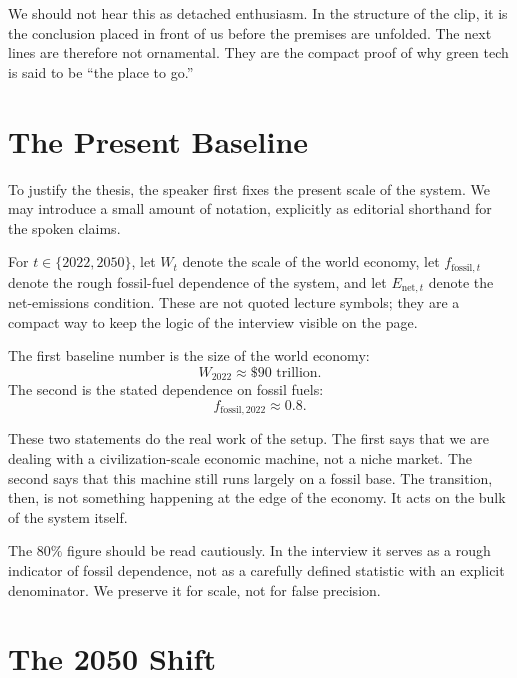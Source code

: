 We should not hear this as detached enthusiasm. In the structure of the clip, it is the conclusion placed in front of us before the premises are unfolded. The next lines are therefore not ornamental. They are the compact proof of why green tech is said to be ``the place to go.''

\section{The Present Baseline}

To justify the thesis, the speaker first fixes the present scale of the system. We may introduce a small amount of notation, explicitly as editorial shorthand for the spoken claims.

\begin{definition}
For \(t \in \{2022,2050\}\), let \(W_t\) denote the scale of the world economy, let \(f_{\mathrm{fossil},t}\) denote the rough fossil-fuel dependence of the system, and let \(E_{\mathrm{net},t}\) denote the net-emissions condition. These are not quoted lecture symbols; they are a compact way to keep the logic of the interview visible on the page.
\end{definition}

The first baseline number is the size of the world economy:
\begin{equation}
W_{2022} \approx \$90\text{ trillion}.
\end{equation}
The second is the stated dependence on fossil fuels:
\begin{equation}
f_{\mathrm{fossil},2022} \approx 0.8.
\end{equation}

These two statements do the real work of the setup. The first says that we are dealing with a civilization-scale economic machine, not a niche market. The second says that this machine still runs largely on a fossil base. The transition, then, is not something happening at the edge of the economy. It acts on the bulk of the system itself.

\begin{remark}
The \(80\%\) figure should be read cautiously. In the interview it serves as a rough indicator of fossil dependence, not as a carefully defined statistic with an explicit denominator. We preserve it for scale, not for false precision.
\end{remark}

\section{The 2050 Shift}

